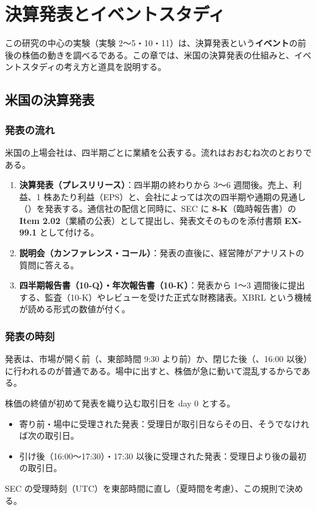 \chapter{決算発表とイベントスタディ}\label{ch:event}

この研究の中心の実験（実験 2〜5・10・11）は、決算発表という\textbf{イベント}の前後の株価の動きを調べるである。この章では、米国の決算発表の仕組みと、イベントスタディの考え方と道具を説明する。

\section{米国の決算発表}

\subsection{発表の流れ}

米国の上場会社は、四半期ごとに業績を公表する。流れはおおむね次のとおりである。

\begin{enumerate}
\item \textbf{決算発表（プレスリリース）}：四半期の終わりから 3〜6 週間後。売上、利益、1 株あたり利益（EPS）と、会社によっては次の四半期や通期の見通し（）を発表する。通信社の配信と同時に、SEC に \textbf{8-K}（臨時報告書）の \textbf{Item 2.02}（業績の公表）として提出し、発表文そのものを添付書類 \textbf{EX-99.1} として付ける。
\item \textbf{説明会（カンファレンス・コール）}：発表の直後に、経営陣がアナリストの質問に答える。
\item \textbf{四半期報告書（10-Q）・年次報告書（10-K）}：発表から 1〜3 週間後に提出する、監査（10-K）やレビューを受けた正式な財務諸表。XBRL という機械が読める形式の数値が付く。
\end{enumerate}

\subsection{発表の時刻}

発表は、市場が開く前（、東部時間 9:30 より前）か、閉じた後（、16:00 以後）に行われるのが普通である。場中に出すと、株価が急に動いて混乱するからである。

\begin{defbox}
株価の終値が初めて発表を織り込む取引日を day 0 とする。
\begin{itemize}
\item 寄り前・場中に受理された発表：受理日が取引日ならその日、そうでなければ次の取引日。
\item 引け後（16:00〜17:30）・17:30 以後に受理された発表：受理日より後の最初の取引日。
\end{itemize}
SEC の受理時刻（UTC）を東部時間に直し（夏時間を考慮）、この規則で決める。
\end{defbox}

